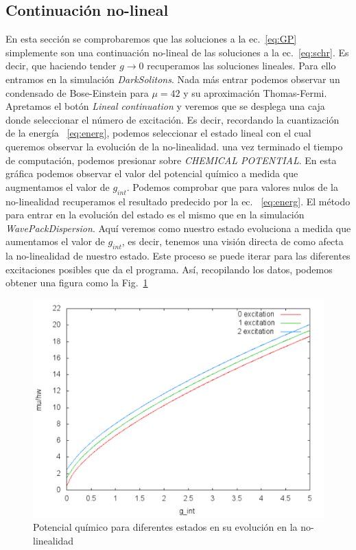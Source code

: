 \documentclass[12pt]{article}
\begin{document}
\subsection{Continuaci\'on no-lineal}
En esta secci\'on se comprobaremos que las soluciones a la ec.~\eqref{eq:GP} simplemente son una continuaci\'on no-lineal de las soluciones a la ec.~\eqref{eq:schr}. Es decir, que haciendo tender $g\rightarrow0$ recuperamos las soluciones lineales. Para ello entramos en la simulaci\'on \textit{DarkSolitons}. Nada m\'as entrar podemos observar un condensado de Bose-Einstein para $\mu=42$ y su aproximaci\'on Thomas-Fermi. Apretamos el bot\'on \textit{Lineal continuation} y veremos que se desplega una caja donde seleccionar el n\'umero de excitaci\'on. Es decir, recordando la cuantizaci\'on de la energ\'ia ~\eqref{eq:energ}, podemos seleccionar el estado lineal con el cual queremos observar la evoluci\'on de la no-linealidad. una vez terminado el tiempo de computaci\'on, podemos presionar sobre \textit{CHEMICAL POTENTIAL}. En esta gr\'afica podemos observar el valor del potencial qu\'imico a medida que augmentamos el valor de $g_{int}$. Podemos comprobar que para valores nulos de la no-linealidad recuperamos el resultado predecido por la ec.  ~\eqref{eq:energ}. El m\'etodo para entrar en la evoluci\'on del estado es el mismo que en la simulaci\'on \textit{WavePackDispersion}. Aqu\'i veremos como nuestro estado evoluciona a medida que aumentamos el valor de $g_{int}$, es decir, tenemos una visi\'on directa de como afecta la no-linealidad de nuestro estado. Este proceso se puede iterar para las diferentes excitaciones posibles que da el programa. As\'i, recopilando los datos, podemos obtener una figura como la Fig.~\ref{Fig:cont_lin}


\begin{figure}[tb]
	\centering
	\includegraphics[width=0.9\linewidth]{cont_lin.pdf}
	\caption{Potencial qu\'imico para diferentes estados en su evoluci\'on en la no-linealidad}
	\label{Fig:cont_lin}
\end{figure}
\end{document}
